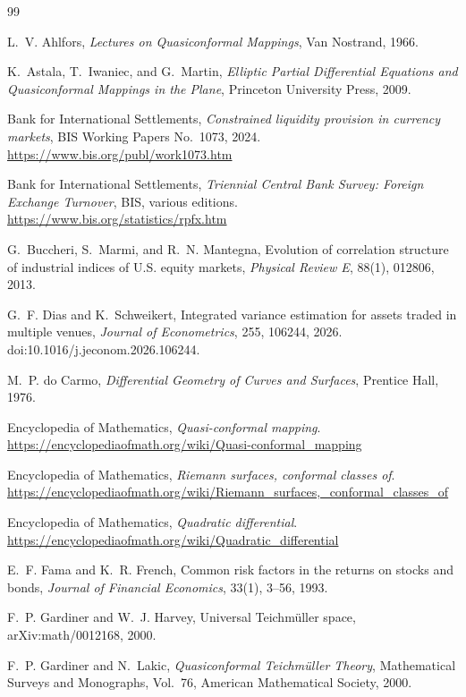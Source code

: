 \documentclass[11pt,a4paper]{article}
\numberwithin{equation}{section}
\begin{document}
\begin{thebibliography}{99}

L.~V. Ahlfors,
\emph{Lectures on Quasiconformal Mappings},
Van Nostrand, 1966.

K.~Astala, T.~Iwaniec, and G.~Martin,
\emph{Elliptic Partial Differential Equations and Quasiconformal
Mappings in the Plane},
Princeton University Press, 2009.

Bank for International Settlements,
\emph{Constrained liquidity provision in currency markets},
BIS Working Papers No.~1073, 2024.
\url{https://www.bis.org/publ/work1073.htm}

Bank for International Settlements,
\emph{Triennial Central Bank Survey: Foreign Exchange Turnover},
BIS, various editions.
\url{https://www.bis.org/statistics/rpfx.htm}

G.~Buccheri, S.~Marmi, and R.~N. Mantegna,
Evolution of correlation structure of industrial indices of U.S.
equity markets,
\emph{Physical Review E},
88(1), 012806, 2013.

G.~F. Dias and K.~Schweikert,
Integrated variance estimation for assets traded in multiple
venues,
\emph{Journal of Econometrics},
255, 106244, 2026.
doi:10.1016/j.jeconom.2026.106244.

M.~P. do Carmo,
\emph{Differential Geometry of Curves and Surfaces},
Prentice Hall, 1976.

Encyclopedia of Mathematics,
\emph{Quasi-conformal mapping}.
\url{https://encyclopediaofmath.org/wiki/Quasi-conformal_mapping}

Encyclopedia of Mathematics,
\emph{Riemann surfaces, conformal classes of}.
\url{https://encyclopediaofmath.org/wiki/Riemann_surfaces,_conformal_classes_of}

Encyclopedia of Mathematics,
\emph{Quadratic differential}.
\url{https://encyclopediaofmath.org/wiki/Quadratic_differential}

E.~F. Fama and K.~R. French,
Common risk factors in the returns on stocks and bonds,
\emph{Journal of Financial Economics},
33(1), 3--56, 1993.

F.~P. Gardiner and W.~J. Harvey,
Universal Teichmüller space,
arXiv:math/0012168, 2000.

F.~P. Gardiner and N.~Lakic,
\emph{Quasiconformal Teichmüller Theory},
Mathematical Surveys and Monographs, Vol.~76,
American Mathematical Society, 2000.


\end{thebibliography}
\end{document}
